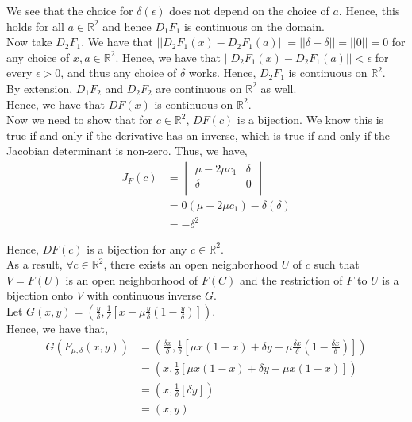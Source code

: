 \documentclass[12pt]{article}
\begin{document}
We see that the choice for $\delta(\epsilon)$ does not depend on the choice of $a$. Hence, this holds for all $a \in \mathbb{R}^2$ and hence $D_1F_1$ is continuous on the domain.\\

Now take $D_2F_1$. We have that $||D_2F_1(x) - D_2F_1(a)|| = ||\delta - \delta|| = ||0|| = 0$ for any choice of $x, a \in \mathbb{R}^2$. Hence, we have that $||D_2F_1(x) - D_2F_1(a)|| < \epsilon$ for every $\epsilon > 0$, and thus any choice of $\delta$ works. Hence, $D_2F_1$ is continuous on $\mathbb{R}^2$.\\

By extension, $D_1F_2$ and $D_2F_2$ are continuous on $\mathbb{R}^2$ as well.\\

Hence, we have that $DF(x)$ is continuous on $\mathbb{R}^2$.\\

Now we need to show that for $c \in \mathbb{R}^2$, $DF(c)$ is a bijection. We know this is true if and only if the derivative has an inverse, which is true if and only if the Jacobian determinant is non-zero. Thus, we have,
\begin{align*}
J_F(c) &= \begin{vmatrix}
\mu - 2\mu c_1 & \delta\\
\delta & 0\\
\end{vmatrix}\\ &= 0(\mu - 2\mu c_1) - \delta(\delta)\\
&= - \delta^2
\end{align*}

Hence, $DF(c)$ is a bijection for any $c \in \mathbb{R}^2$.\\

As a result, $\forall c \in \mathbb{R}^2$, there exists an open neighborhood $U$ of $c$ such that $V = F(U)$ is an open neighborhood of $F(C)$ and the restriction of $F$ to $U$ is a bijection onto $V$ with continuous inverse $G$.\\

Let $G(x, y) = (\frac{y}{\delta}, \frac{1}{\delta}[x - \mu\frac{y}{\delta}(1 - \frac{y}{\delta})])$.\\

Hence, we have that,
\begin{align*}
G(F_{\mu, \delta}(x, y)) &= (\frac{\delta x}{\delta}, \frac{1}{\delta}[\mu x(1 - x) + \delta y - \mu\frac{\delta x}{\delta}(1 - \frac{\delta x}{\delta})])\\
&= (x, \frac{1}{\delta}[\mu x(1 - x) + \delta y - \mu x(1 -  x)])\\
&= (x, \frac{1}{\delta}[\delta y])\\
&= (x, y)
\end{align*}
\end{document}
